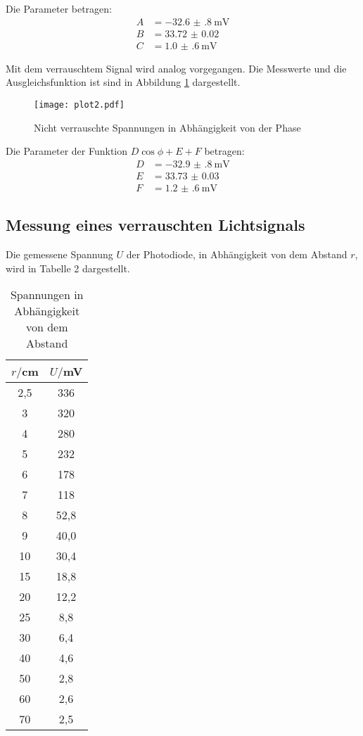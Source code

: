 Die Parameter betragen:
\begin{align*}
  A &= \SI{-32.6(8)}{\milli\volt} \\
  B &= \SI{33.72(2)}{} \\
  C &= \SI{1.0(6)}{\milli\volt}
\end{align*}


Mit dem verrauschtem Signal wird analog vorgegangen. Die Messwerte und die Ausgleichsfunktion ist sind in Abbildung \ref{fig:plot2} dargestellt.

\begin{figure}[H]
  \centering
  \texttt{[image: plot2.pdf]}
  \caption{Nicht verrauschte Spannungen in Abhängigkeit von der Phase}
  \label{fig:plot2}
\end{figure}


Die Parameter der Funktion $D \cos{\phi + E} + F$ betragen:
\begin{align*}
  D &= \SI{-32.9(8)}{\milli\volt} \\
  E &= \SI{33.73(3)}{} \\
  F &= \SI{1.2(6)}{\milli\volt}
\end{align*}



\subsection{Messung eines verrauschten Lichtsignals}
Die gemessene Spannung $U$ der Photodiode, in Abhängigkeit von dem Abstand $r$, wird in Tabelle 2 dargestellt.

\begin{table}[H]
  \centering
  \caption{Spannungen in Abhängigkeit von dem Abstand}
  \label{tab:Phase}
  \begin{tabular}{c c}
    \toprule
    $r/$cm  &  $U/$mV \\
    \midrule
     2,5   &    336    \\
     3     &    320    \\
     4     &    280    \\
     5     &    232    \\
     6     &    178    \\
     7     &    118    \\
     8     &    52,8    \\
     9     &    40,0    \\
    10     &    30,4    \\
    15     &    18,8    \\
    20     &    12,2    \\
    25     &    8,8     \\
    30     &    6,4     \\
    40     &    4,6     \\
    50     &    2,8     \\
    60     &    2,6     \\
    70     &    2,5     \\
    \bottomrule
  \end{tabular}
\end{table}

